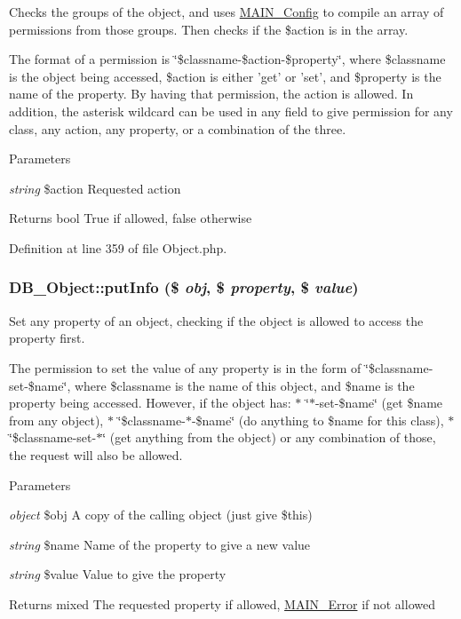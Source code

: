 Checks the groups of the object, and uses \hyperlink{classMAIN__Config}{MAIN\_\-Config} to compile an array of permissions from those groups. Then checks if the \$action is in the array.

The format of a permission is \char`\"{}\$classname-\/\$action-\/\$property\char`\"{}, where \$classname is the object being accessed, \$action is either 'get' or 'set', and \$property is the name of the property. By having that permission, the action is allowed. In addition, the asterisk wildcard can be used in any field to give permission for any class, any action, any property, or a combination of the three.


\begin{DoxyParams}{Parameters}
\item[{\em string}]\$action Requested action\end{DoxyParams}
\begin{DoxyReturn}{Returns}
bool True if allowed, false otherwise 
\end{DoxyReturn}


Definition at line 359 of file Object.php.\hypertarget{classDB__Object_a96ce58f2dd8e64902dbd72a072083a0c}{
\subsubsection[{putInfo}]{\setlength{\rightskip}{0pt plus 5cm}DB\_\-Object::putInfo (\$ {\em obj}, \/  \$ {\em property}, \/  \$ {\em value})}}
\label{dc/d6d/classDB__Object_a96ce58f2dd8e64902dbd72a072083a0c}
Set any property of an object, checking if the object is allowed to access the property first.

The permission to set the value of any property is in the form of \char`\"{}\$classname-\/set-\/\$name\char`\"{}, where \$classname is the name of this object, and \$name is the property being accessed. However, if the object has: $\ast$ \char`\"{}$\ast$-\/set-\/\$name\char`\"{} (get \$name from any object), $\ast$ \char`\"{}\$classname-\/$\ast$-\/\$name\char`\"{} (do anything to \$name for this class), $\ast$ \char`\"{}\$classname-\/set-\/$\ast$\char`\"{} (get anything from the object) or any combination of those, the request will also be allowed.


\begin{DoxyParams}{Parameters}
\item[{\em object}]\$obj A copy of the calling object (just give \$this) \item[{\em string}]\$name Name of the property to give a new value \item[{\em string}]\$value Value to give the property\end{DoxyParams}
\begin{DoxyReturn}{Returns}
mixed The requested property if allowed, \hyperlink{classMAIN__Error}{MAIN\_\-Error} if not allowed 
\end{DoxyReturn}


